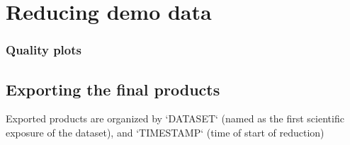 
\section{Reducing demo data}
\label{sec:reducing_demo_data}



 
\subsubsection{Quality plots}


\subsection{Exporting the final products}
\label{sec:export_final_products}



 
 
Exported products are organized by `DATASET` (named as the first
scientific exposure of the dataset), and `TIMESTAMP` (time of start of
reduction)


